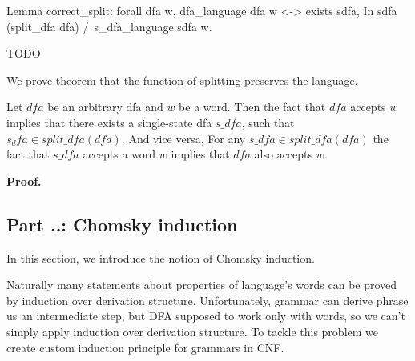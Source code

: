 



\begin{listing}[h]
    \begin{pyglist}[language=coq, numbers=none, numbersep=5pt]
  Lemma correct_split:
    forall dfa w,
      dfa_language dfa w <->
      exists sdfa, 
         In sdfa (split_dfa dfa) /\ 
         s_dfa_language sdfa w.
    \end{pyglist}
    \caption{TODO}
    \label{lst:verbments1}
\end{listing}

We prove theorem that the function of splitting preserves the language.

\begin{theorem}
  Let $dfa$ be an arbitrary dfa and $w$ be a word. Then the fact that $dfa$ accepts $w$ implies that there exists a single-state dfa $s\_dfa$, such that $s_dfa \in split\_dfa(dfa)$. And vice versa, For any $s\_dfa \in split\_dfa(dfa)$ the fact that $s\_dfa$ accepts a word $w$ implies that $dfa$ also accepts $w$.
\end{theorem}

\textbf{Proof.}

\subsection{Part ..: Chomsky induction}

In this section, we introduce the notion of Chomsky induction.

Naturally many statements about properties of language's words can be proved by induction over derivation structure. Unfortunately, grammar can derive phrase us an intermediate step, but DFA supposed to work only with words, so we can’t simply apply induction over derivation structure. To tackle this problem we create custom induction principle for grammars in CNF.

